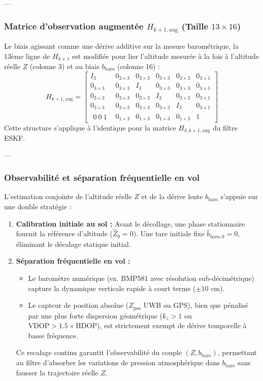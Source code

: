 \documentclass[../Formulations_Kalman.tex]{subfiles}
\begin{document}
---

\subsubsection{Matrice d'observation augmentée $H_{k+1,\text{aug}}$ (Taille $13 \times 16$)}
Le biais agissant comme une dérive additive sur la mesure barométrique, la 13ème ligne de $H_{k+1}$ est modifiée pour lier l'altitude mesurée à la fois à l'altitude réelle $Z$ (colonne 3) et au biais $b_{\text{baro}}$ (colonne 16) :
\begin{equation}
H_{k+1,\text{aug}} = \begin{bmatrix}
I_3 & 0_{3\times3} & 0_{3\times3} & 0_{3\times3} & 0_{3\times3} & 0_{3\times1} \\
0_{3\times3} & 0_{3\times3} & I_3 & 0_{3\times3} & 0_{3\times3} & 0_{3\times1} \\
0_{3\times3} & 0_{3\times3} & 0_{3\times3} & I_3 & 0_{3\times3} & 0_{3\times1} \\
0_{3\times3} & 0_{3\times3} & 0_{3\times3} & 0_{3\times3} & I_3 & 0_{3\times1} \\
\begin{matrix} 0\ 0\ 1 \end{matrix} & 0_{1\times3} & 0_{1\times3} & 0_{1\times3} & 0_{1\times3} & 1
\end{bmatrix}
\end{equation}
Cette structure s'applique à l'identique pour la matrice $H_{\delta, k+1,\text{aug}}$ du filtre ESKF.

---

\subsubsection{Observabilité et séparation fréquentielle en vol}
L'estimation conjointe de l'altitude réelle $Z$ et de la dérive lente $b_{\text{baro}}$ s'appuie sur une double stratégie :
\begin{enumerate}
    \item \textbf{Calibration initiale au sol :} Avant le décollage, une phase stationnaire fournit la référence d'altitude ($\hat{Z}_0 = 0$). Une tare initiale fixe $\hat{b}_{\text{baro}, 0} = 0$, éliminant le décalage statique initial.
    \item \textbf{Séparation fréquentielle en vol :}
    \begin{itemize}
        \item Le baromètre numérique (ex. BMP581 avec résolution sub-décimétrique) capture la dynamique verticale rapide à court terme ($\pm 10\text{ cm}$).
        \item Le capteur de position absolue ($Z_{\text{pos}}$ UWB ou GPS), bien que pénalisé par une plus forte dispersion géométrique ($k_z > 1$ ou $\text{VDOP} > 1.5 \times \text{HDOP}$), est strictement exempt de dérive temporelle à basse fréquence.
    \end{itemize}
    Ce recalage continu garantit l'observabilité du couple $(Z, b_{\text{baro}})$, permettant au filtre d'absorber les variations de pression atmosphérique dans $b_{\text{baro}}$ sans fausser la trajectoire réelle $Z$.
\end{enumerate}
\end{document}
